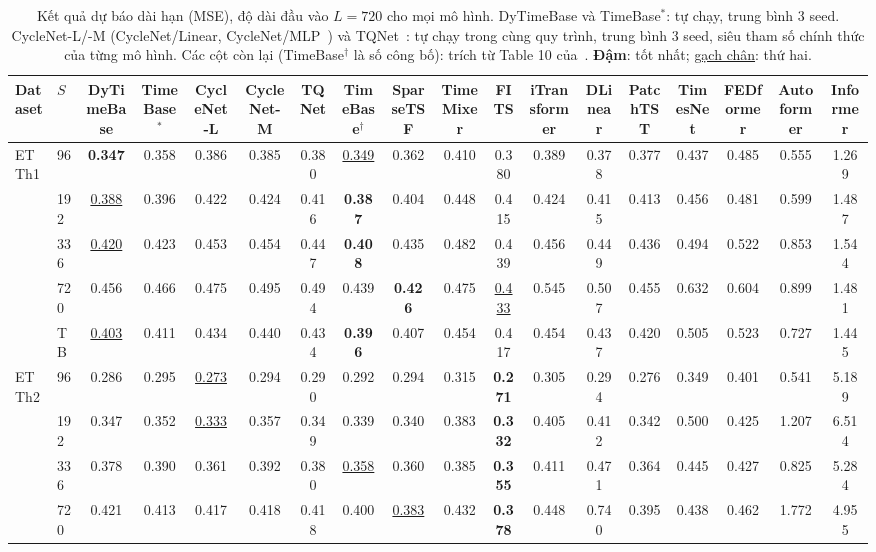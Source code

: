 \begin{table}
\centering
\caption{Kết quả dự báo dài hạn (MSE), độ dài đầu vào $L=720$ cho mọi mô hình. DyTimeBase và TimeBase$^{*}$: tự chạy, trung bình 3 seed. CycleNet-L/-M (CycleNet/Linear, CycleNet/MLP~\cite{cyclenet}) và TQNet~\cite{tqnet}: tự chạy trong cùng quy trình, trung bình 3 seed, siêu tham số chính thức của từng mô hình. Các cột còn lại (TimeBase$^{\dagger}$ là số công bố): trích từ Table 10 của~\cite{timebase}. \textbf{Đậm}: tốt nhất; \underline{gạch chân}: thứ hai.}
\label{tab:acc-mse}
\scriptsize
\setlength{\tabcolsep}{2.4pt}
\begin{tabular}{@{}llcccccccccccccccc@{}}
\toprule
Dataset & $S$ & \textbf{DyTimeBase} & TimeBase$^{*}$ & CycleNet-L & CycleNet-M & TQNet & TimeBase$^{\dagger}$ & SparseTSF & TimeMixer & FITS & iTransformer & DLinear & PatchTST & TimesNet & FEDformer & Autoformer & Informer\\
\midrule
\multirow{5}{*}{ETTh1} & 96 & \textbf{0.347} & 0.358 & 0.386 & 0.385 & 0.380 & \underline{0.349} & 0.362 & 0.410 & 0.380 & 0.389 & 0.378 & 0.377 & 0.437 & 0.485 & 0.555 & 1.269\\
 & 192 & \underline{0.388} & 0.396 & 0.422 & 0.424 & 0.416 & \textbf{0.387} & 0.404 & 0.448 & 0.415 & 0.424 & 0.415 & 0.413 & 0.456 & 0.481 & 0.599 & 1.487\\
 & 336 & \underline{0.420} & 0.423 & 0.453 & 0.454 & 0.447 & \textbf{0.408} & 0.435 & 0.482 & 0.439 & 0.456 & 0.449 & 0.436 & 0.494 & 0.522 & 0.853 & 1.544\\
 & 720 & 0.456 & 0.466 & 0.475 & 0.495 & 0.494 & 0.439 & \textbf{0.426} & 0.475 & \underline{0.433} & 0.545 & 0.507 & 0.455 & 0.632 & 0.604 & 0.899 & 1.481\\
 & TB & \underline{0.403} & 0.411 & 0.434 & 0.440 & 0.434 & \textbf{0.396} & 0.407 & 0.454 & 0.417 & 0.454 & 0.437 & 0.420 & 0.505 & 0.523 & 0.727 & 1.445\\
\midrule
\multirow{5}{*}{ETTh2} & 96 & 0.286 & 0.295 & \underline{0.273} & 0.294 & 0.290 & 0.292 & 0.294 & 0.315 & \textbf{0.271} & 0.305 & 0.294 & 0.276 & 0.349 & 0.401 & 0.541 & 5.189\\
 & 192 & 0.347 & 0.352 & \underline{0.333} & 0.357 & 0.349 & 0.339 & 0.340 & 0.383 & \textbf{0.332} & 0.405 & 0.412 & 0.342 & 0.500 & 0.425 & 1.207 & 6.514\\
 & 336 & 0.378 & 0.390 & 0.361 & 0.392 & 0.380 & \underline{0.358} & 0.360 & 0.385 & \textbf{0.355} & 0.411 & 0.471 & 0.364 & 0.445 & 0.427 & 0.825 & 5.284\\
 & 720 & 0.421 & 0.413 & 0.417 & 0.418 & 0.418 & 0.400 & \underline{0.383} & 0.432 & \textbf{0.378} & 0.448 & 0.740 & 0.395 & 0.438 & 0.462 & 1.772 & 4.955\\

\end{tabular}
\end{table}
